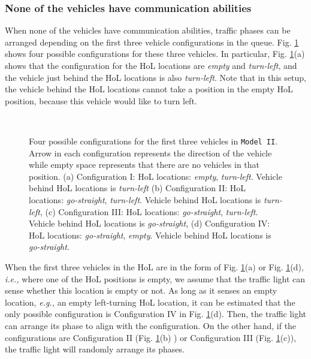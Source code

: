 \documentclass[conference]{IEEEtran}
\newcommand{\ie}{{\em i.e., }}
\newcommand{\eg}{{\em e.g., }}
\newcommand{\modelII}{{\tt{Model II}}}
\begin{document}
\subsubsection{None of the vehicles have communication abilities}\label{nocarscantellmodel2}
When none of the vehicles have communication abilities, traffic phases can be arranged depending on the first three vehicle configurations in the queue. Fig. \ref{fig:holconfiguration} shows four possible configurations for these three vehicles. In particular, Fig. \ref{fig:holconfiguration}(a) shows that the configuration for the HoL locations are {\em empty} and {\em turn-left}, and the vehicle just behind the HoL locations is also {\em turn-left}. Note that in this setup, the vehicle behind the HoL locations cannot take a position in the empty HoL position, because this vehicle would like to turn left.

\begin{figure}[t!]
\vspace{-10pt}
\begin{center}
 \hspace{15pt}
 \\
  \hspace{15pt}
\end{center}
\begin{center}
\caption{\label{fig:holconfiguration} Four possible configurations for the first three vehicles in \modelII. Arrow in each configuration represents the direction of the vehicle while empty space represents that there are no vehicles in that position. (a) Configuration I: HoL locations: {\em empty}, {\em turn-left}. Vehicle behind HoL locations is {\em turn-left} (b) Configuration II: HoL locations: {\em go-straight}, {\em turn-left}. Vehicle behind HoL locations is {\em turn-left}, (c) Configuration III: HoL locations: {\em go-straight}, {\em turn-left}. Vehicle behind HoL locations is {\em go-straight}, (d) Configuration IV: HoL locations: {\em go-straight}, {\em empty}. Vehicle behind HoL locations is {\em go-straight}.}
\vspace{-20pt}
\end{center}
\end{figure}

When the first three vehicles in the HoL are in the form of Fig. \ref{fig:holconfiguration}(a) or Fig. \ref{fig:holconfiguration}(d), \ie where one of the HoL positions is empty, we assume that the traffic light can sense whether this location is empty or not. As long as it senses an empty location, \eg an empty left-turning HoL location, it can be estimated that the only possible configuration is Configuration IV in Fig. \ref{fig:holconfiguration}(d). Then, the traffic light can arrange its phase to align with the configuration. On the other hand, if the configurations are Configuration II (Fig. \ref{fig:holconfiguration}(b) ) or Configuration III (Fig. \ref{fig:holconfiguration}(c)), the traffic light will randomly arrange its phases.
\end{document}
